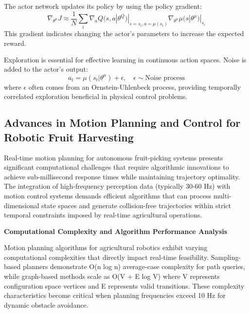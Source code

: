 \documentclass{ieeeaccess}
\begin{document}
The actor network updates its policy by using the policy gradient:
\begin{equation}
\nabla_{\theta^\mu} J \approx \frac{1}{N} \sum_i \nabla_a Q(s, a | \theta^Q)|_{s=s_i, a=\mu(s_i)} \nabla_{\theta^\mu} \mu(s | \theta^\mu)|_{s_i}
\end{equation}
This gradient indicates changing the actor's parameters to increase the expected reward.

Exploration is essential for effective learning in continuous action spaces. Noise is added to the actor's output:
\begin{equation}
a_t = \mu(s_t|\theta^\mu) + \epsilon, \quad \epsilon \sim \text{Noise process}
\end{equation}
where \( \epsilon \) often comes from an Ornstein-Uhlenbeck process, providing temporally correlated exploration beneficial in physical control problems.

\subsection{Advances in Motion Planning and Control for Robotic Fruit Harvesting}
Real-time motion planning for autonomous fruit-picking systems presents significant computational challenges that require algorithmic innovations to achieve sub-millisecond response times while maintaining trajectory optimality. The integration of high-frequency perception data (typically 30-60 Hz) with motion control systems demands efficient algorithms that can process multi-dimensional state spaces and generate collision-free trajectories within strict temporal constraints imposed by real-time agricultural operations.

\textbf{Computational Complexity and Algorithm Performance Analysis}

Motion planning algorithms for agricultural robotics exhibit varying computational complexities that directly impact real-time feasibility. Sampling-based planners demonstrate O(n log n) average-case complexity for path queries, while graph-based methods scale as O(V + E log V) where V represents configuration space vertices and E represents valid transitions. These complexity characteristics become critical when planning frequencies exceed 10 Hz for dynamic obstacle avoidance.
\end{document}
